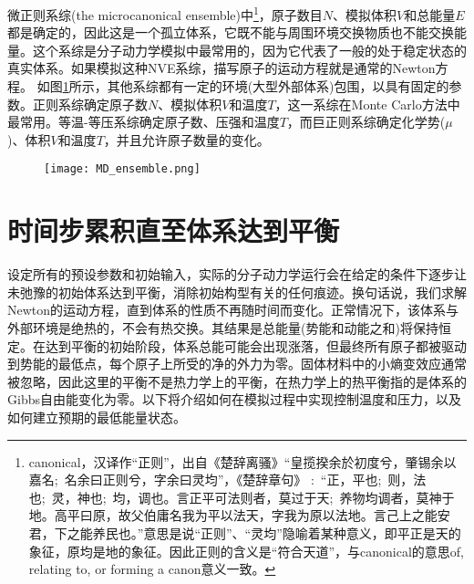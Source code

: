 微正则系综\textrm{(the microcanonical ensemble)}中\footnote{\textrm{canonical}，汉译作``正则''，出自《楚辞\textperiodcentered 离骚》``皇揽揆余於初度兮，肇锡余以嘉名;~名余曰正则兮，字余曰灵均''，《楚辞章句》%
:~``正，平也;~则，法也;~灵，神也;~均，调也。言正平可法则者，莫过于天;~养物均调者，莫神于地。高平曰原，故父伯庸名我为平以法天，字我为原以法地。言己上之能安君，下之能养民也。''意思是说``正则''、``灵均''隐喻着某种意义，即平正是天的象征，原均是地的象征。因此正则的含义是``符合天道''，与\textrm{canonical}的意思\textrm{of, relating to, or forming a canon}意义一致。}，原子数目$N$、模拟体积$V$和总能量$E$都是确定的，因此这是一个孤立体系，它既不能与周围环境交换物质也不能交换能量。这个系综是分子动力学模拟中最常用的，因为它代表了一般的处于稳定状态的真实体系。如果模拟这种NVE系综，描写原子的运动方程就是通常的\textrm{Newton}方程。
如图\ref{MD_ensemble}所示，其他系综都有一定的环境(大型外部体系)包围，以具有固定的参数。正则系综确定原子数$N$、模拟体积$V$和温度$T$，这一系综在\textrm{Monte Carlo}方法中最常用。等温-等压系综确定原子数、压强$和$温度$T$，而巨正则系综确定化学势($\mu$)、体积$V$和温度$T$，并且允许原子数量的变化。
\begin{figure}[h!]
\centering
\vspace*{-0.1in}
\texttt{[image: MD\_ensemble.png]}
\caption{\fontsize{7.2pt}{4.2pt}}%
\label{MD_ensemble}
\end{figure}

\section{时间步累积直至体系达到平衡}
设定所有的预设参数和初始输入，实际的分子动力学运行会在给定的条件下逐步让未弛豫的初始体系达到平衡，消除初始构型有关的任何痕迹。换句话说，我们求解\textrm{Newton}的运动方程，直到体系的性质不再随时间而变化。正常情况下，该体系与外部环境是绝热的，不会有热交换。其结果是总能量(势能和动能之和)将保持恒定。在达到平衡的初始阶段，体系总能可能会出现涨落，但最终所有原子都被驱动到势能的最低点，每个原子上所受的净的外力为零。固体材料中的小熵变效应通常被忽略，因此这里的平衡不是热力学上的平衡，在热力学上的热平衡指的是体系的\textrm{Gibbs}自由能变化为零。以下将介绍如何在模拟过程中实现控制温度和压力，以及如何建立预期的最低能量状态。
